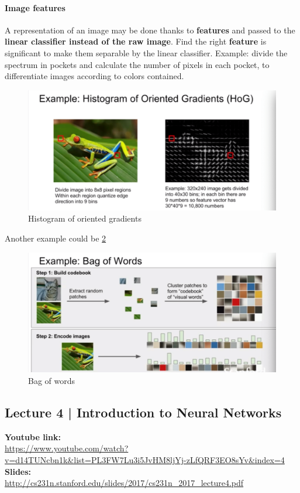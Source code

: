 \documentclass[11pt]{article}
\begin{document}
\paragraph{Image features}
A representation  of an image may be done thanks to \textbf{features} and passed to the \textbf{linear classifier instead of the raw image}.
Find the right \textbf{feature} is significant to make them separable by the linear classifier. Example: divide the spectrum in pockets and calculate the number of pixels in each pocket, to differentiate images according to colors contained.
\begin{figure}[h]
\centering
\captionsetup{justification=centering}
\includegraphics[width=0.7\linewidth]{L219.pdf}
\caption{ Histogram of oriented gradients}
\label{fig:L219}
\end{figure}
\clearpage
Another example could be \ref{fig:L220}
  \begin{figure}[h]
\centering
\captionsetup{justification=centering}
\includegraphics[width=0.7\linewidth]{L220.pdf}
\caption{ Bag of words}
\label{fig:L220}
\end{figure}





\clearpage
\subsection{Lecture 4 | Introduction to Neural Networks}
\textbf{Youtube link:}\\
\url{https://www.youtube.com/watch?v=d14TUNcbn1k&list=PL3FW7Lu3i5JvHM8ljYj-zLfQRF3EO8sYv&index=4}\\
\textbf{Slides:}\\
\url{http://cs231n.stanford.edu/slides/2017/cs231n_2017_lecture4.pdf}
\end{document}
